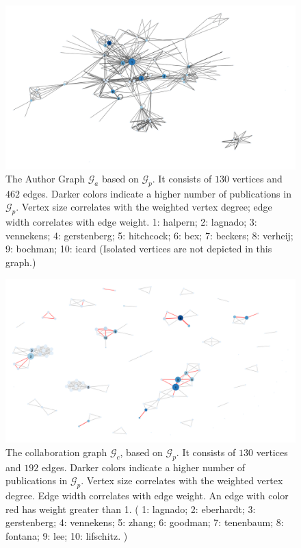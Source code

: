 \documentclass[11pt,a4paper]{book}
\theoremstyle{definition}
\theoremstyle{definition}
\theoremstyle{definition}
\theoremstyle{remark}
\newcommand{\pgraph}{\mathcal{G}_{p}}
\newcommand{\agraph}{\mathcal{G}_{a}}
\newcommand{\cgraph}{\mathcal{G}_{c}}
\begin{document}
\begin{figure}
\includegraphics[width=\textwidth]{author_graph.png}
\caption{The Author Graph  $\agraph$ based on $\pgraph$. It consists of  $130$ vertices and $462$ edges. 
Darker colors indicate a higher number of publications in $\pgraph$. Vertex size correlates with the weighted vertex degree; 
edge width correlates with edge weight.
1: halpern;
2: lagnado;
3: vennekens;
4: gerstenberg;
5: hitchcock;
6: bex;
7: beckers;
8: verheij;
9: bochman;
10: icard (Isolated vertices are not depicted in this graph.)}
\label{fig:agraph-actual_graph}
\end{figure}




\begin{figure}
\includegraphics[width=\textwidth]{collab_graph.png}
\caption{The collaboration graph  $\cgraph$, based on $\pgraph$. It consists of  $130$ vertices and $192$ edges. 
Darker colors indicate a higher number of publications in $\pgraph$. Vertex size correlates with the weighted vertex degree.
Edge width correlates with edge weight. An edge with color red has weight greater than 1. 
(
1: lagnado;
2: eberhardt;
3: gerstenberg;
4: vennekens;
5: zhang;
6: goodman;
7: tenenbaum;
8: fontana;
9: lee;
10: lifschitz.
)}
\label{fig:cgraph-actual_graph}
\end{figure}
\end{document}
